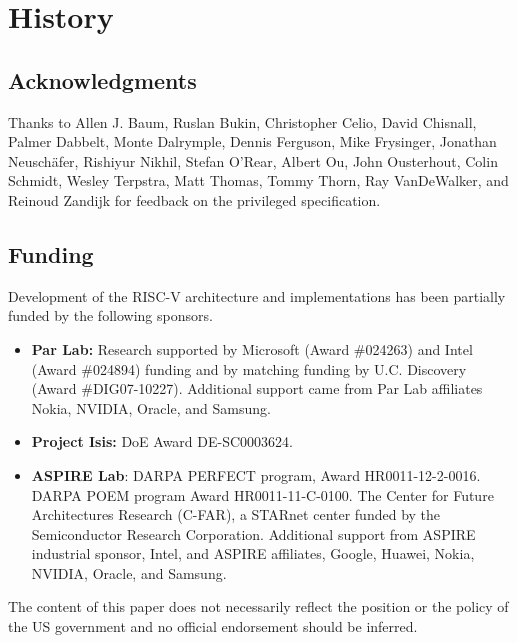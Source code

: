 \chapter{History}

\section*{Acknowledgments}

Thanks to Allen J. Baum, Ruslan Bukin, Christopher Celio, David
Chisnall, Palmer Dabbelt, Monte Dalrymple, Dennis Ferguson, Mike
Frysinger, Jonathan Neusch{\"a}fer, Rishiyur Nikhil, Stefan O'Rear,
Albert Ou, John Ousterhout, Colin Schmidt, Wesley Terpstra, Matt
Thomas, Tommy Thorn, Ray VanDeWalker, and Reinoud Zandijk for feedback
on the privileged specification.

\section{Funding}

Development of the RISC-V architecture and implementations has been
partially funded by the following sponsors.
\begin{itemize}
\item {\bf Par Lab:} Research supported by Microsoft (Award \#024263)
  and Intel (Award \#024894) funding and by matching funding by
  U.C. Discovery (Award \#DIG07-10227). Additional support came from
  Par Lab affiliates Nokia, NVIDIA, Oracle, and Samsung.

\item {\bf Project Isis:} DoE Award DE-SC0003624.

\item {\bf ASPIRE Lab}: DARPA PERFECT program, Award HR0011-12-2-0016.
  DARPA POEM program Award HR0011-11-C-0100.  The Center for Future
  Architectures Research (C-FAR), a STARnet center funded by the
  Semiconductor Research Corporation.  Additional support from ASPIRE
  industrial sponsor, Intel, and ASPIRE affiliates, Google, Huawei,
  Nokia, NVIDIA, Oracle, and Samsung.
\end{itemize}

The content of this paper does not necessarily reflect the position or the
policy of the US government and no official endorsement should be
inferred. 
